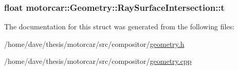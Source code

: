 \hypertarget{structmotorcar_1_1Geometry_1_1RaySurfaceIntersection_af32545772aead85519b20869fbc34284}{
\subsubsection[{t}]{\setlength{\rightskip}{0pt plus 5cm}float motorcar\-::\-Geometry\-::\-Ray\-Surface\-Intersection\-::t}}\label{structmotorcar_1_1Geometry_1_1RaySurfaceIntersection_af32545772aead85519b20869fbc34284}


The documentation for this struct was generated from the following files\-:\begin{DoxyCompactItemize}
\item 
/home/dave/thesis/motorcar/src/compositor/\hyperlink{geometry_8h}{geometry.\-h}\item 
/home/dave/thesis/motorcar/src/compositor/\hyperlink{geometry_8cpp}{geometry.\-cpp}\end{DoxyCompactItemize}
